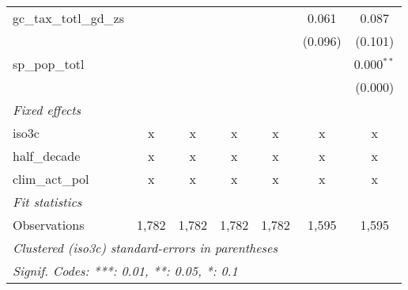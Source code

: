 \begin{tabular}{lcccccc}
   gc\_tax\_totl\_gd\_zs                                &         &         &         &               & 0.061          & 0.087\\   
                                                        &         &         &         &               & (0.096)        & (0.101)\\   
   sp\_pop\_totl                                        &         &         &         &               &                & 0.000$^{**}$\\   
                                                        &         &         &         &               &                & (0.000)\\   
   \emph{Fixed effects}\\
   iso3c                                                & x       & x       & x       & x             & x              & x\\  
   half\_decade                                         & x       & x       & x       & x             & x              & x\\  
   clim\_act\_pol                                       & x       & x       & x       & x             & x              & x\\  
   \midrule \emph{Fit statistics}\\
   Observations                                         & 1,782   & 1,782   & 1,782   & 1,782         & 1,595          & 1,595\\  
   \midrule
   \multicolumn{7}{l}{\emph{Clustered (iso3c) standard-errors in parentheses}}\\
   \multicolumn{7}{l}{\emph{Signif. Codes: ***: 0.01, **: 0.05, *: 0.1}}\\
\end{tabular}
\par\endgroup


